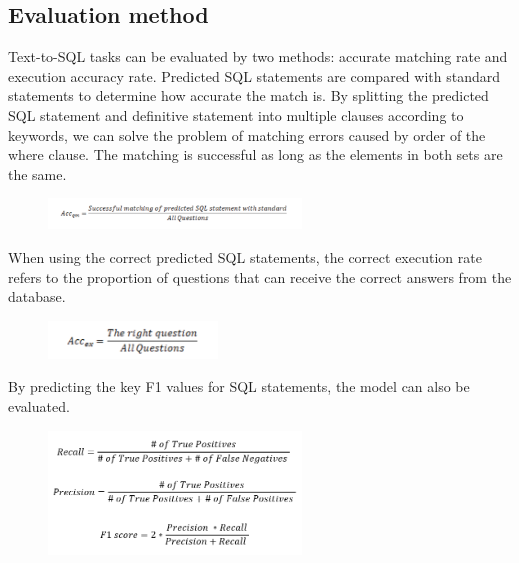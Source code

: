 \subsection{Evaluation method}

Text-to-SQL tasks can be evaluated by two methods: accurate matching rate and execution accuracy rate. Predicted SQL statements are compared with standard statements to determine how accurate the match is.
By splitting the predicted SQL statement and definitive statement into multiple clauses according to keywords, we can solve the problem of matching errors caused by order of the where clause. The matching is successful as long as the elements in both sets are the same.

\begin{figure}[htb]
    \centering
    \includegraphics[width=0.6\textwidth]{pics/acc1.png}
    \label{fig:acc1}
\end{figure}

When using the correct predicted SQL statements, the correct execution rate refers to the proportion of questions that can receive the correct answers from the database.

\begin{figure}[htb]
    \centering
    \includegraphics[width=0.4\textwidth]{pics/acc2.png}
    \label{fig:acc2}
\end{figure}

By predicting the key F1 values for SQL statements, the model can also be evaluated.

\begin{figure}[htb]
    \centering
    \includegraphics[width=0.6\textwidth]{pics/f1.png}
    \label{fig:f1}
\end{figure}